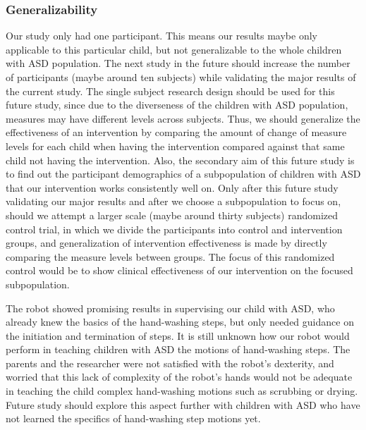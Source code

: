 \subsubsection{Generalizability}
Our study only had one participant.  This means our results maybe only applicable to this particular child, but not generalizable to the whole children with ASD population.  The next study in the future should increase the number of participants (maybe around ten subjects) while validating the major results of the current study.  The single subject research design should be used for this future study, since due to the diverseness of the children with ASD population, measures may have different levels across subjects.  Thus, we should generalize the effectiveness of an intervention by comparing the amount of change of measure levels for each child when having the intervention compared against that same child not having the intervention.  Also, the secondary aim of this future study is to find out the participant demographics of a subpopulation of children with ASD that our intervention works consistently well on.  Only after this future study validating our major results and after we choose a subpopulation to focus on, should we attempt a larger scale (maybe around thirty subjects) randomized control trial, in which we divide the participants into control and intervention groups, and generalization of intervention effectiveness is made by directly comparing the measure levels between groups.  The focus of this randomized control would be to show clinical effectiveness of our intervention on the focused subpopulation.

The robot showed promising results in supervising our child with ASD, who already knew the basics of the hand-washing steps, but only needed guidance on the initiation and termination of steps.  It is still unknown how our robot would perform in teaching children with ASD the motions of hand-washing steps.  The parents and the researcher were not satisfied with the robot's dexterity, and worried that this lack of complexity of the robot's hands would not be adequate in teaching the child complex hand-washing motions such as scrubbing or drying.  Future study should explore this aspect further with children with ASD who have not learned the specifics of hand-washing step motions yet.

